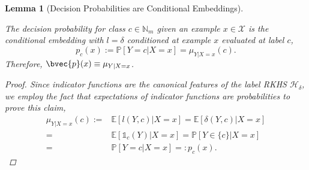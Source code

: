 \documentclass{article}
\newtheorem{lemma}[theorem]{Lemma}
\begin{document}
	\begin{lemma}[Decision Probabilities are Conditional Embeddings]
	\label{thm:probability_is_embedding}
	
		The decision probability for class $c \in \mathbb{N}_{m}$ given an example $x \in \mathcal{X}$ is the conditional embedding with $l = \delta$ conditioned at example $x$ evaluated at label $c$,
		\begin{equation}
			p_{c}(x) := \mathbb{P}[Y = c | X = x] = \mu_{Y | X = x}(c).
		\end{equation}
		Therefore, $\bvec{p}(x) \equiv \mu_{Y | X = x}$.
		
		\begin{proof} 
		
			Since indicator functions are the canonical features of the label RKHS $\mathcal{H}_{\delta}$, we employ the fact that expectations of indicator functions are probabilities to prove this claim,
			\begin{equation}
			\begin{aligned}
				\mu_{Y | X = x}(c) :=& \mathbb{E}[l(Y, c) | X = x ]= \mathbb{E}[\delta(Y, c) | X = x] \\
				=& \mathbb{E}[\mathbb{1}_{c}(Y) | X = x] = \mathbb{P}[Y \in \{c\} | X = x] \\
				=& \mathbb{P}[Y = c | X = x] =: p_{c}(x).
			\end{aligned}
			\end{equation}
		\end{proof}

	\end{lemma}
	
\end{document}
